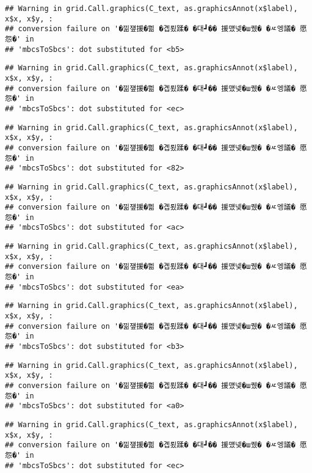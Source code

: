 \documentclass[
]{article}
\begin{document}
\begin{verbatim}
## Warning in grid.Call.graphics(C_text, as.graphicsAnnot(x$label), x$x, x$y, :
## conversion failure on '�낆쟾援�쁾 �곕룄蹂� �대┛�� 援먰넻�ш퀬� �ㅼ엥議� 愿怨�' in
## 'mbcsToSbcs': dot substituted for <b5>
\end{verbatim}

\begin{verbatim}
## Warning in grid.Call.graphics(C_text, as.graphicsAnnot(x$label), x$x, x$y, :
## conversion failure on '�낆쟾援�쁾 �곕룄蹂� �대┛�� 援먰넻�ш퀬� �ㅼ엥議� 愿怨�' in
## 'mbcsToSbcs': dot substituted for <ec>
\end{verbatim}

\begin{verbatim}
## Warning in grid.Call.graphics(C_text, as.graphicsAnnot(x$label), x$x, x$y, :
## conversion failure on '�낆쟾援�쁾 �곕룄蹂� �대┛�� 援먰넻�ш퀬� �ㅼ엥議� 愿怨�' in
## 'mbcsToSbcs': dot substituted for <82>
\end{verbatim}

\begin{verbatim}
## Warning in grid.Call.graphics(C_text, as.graphicsAnnot(x$label), x$x, x$y, :
## conversion failure on '�낆쟾援�쁾 �곕룄蹂� �대┛�� 援먰넻�ш퀬� �ㅼ엥議� 愿怨�' in
## 'mbcsToSbcs': dot substituted for <ac>
\end{verbatim}

\begin{verbatim}
## Warning in grid.Call.graphics(C_text, as.graphicsAnnot(x$label), x$x, x$y, :
## conversion failure on '�낆쟾援�쁾 �곕룄蹂� �대┛�� 援먰넻�ш퀬� �ㅼ엥議� 愿怨�' in
## 'mbcsToSbcs': dot substituted for <ea>
\end{verbatim}

\begin{verbatim}
## Warning in grid.Call.graphics(C_text, as.graphicsAnnot(x$label), x$x, x$y, :
## conversion failure on '�낆쟾援�쁾 �곕룄蹂� �대┛�� 援먰넻�ш퀬� �ㅼ엥議� 愿怨�' in
## 'mbcsToSbcs': dot substituted for <b3>
\end{verbatim}

\begin{verbatim}
## Warning in grid.Call.graphics(C_text, as.graphicsAnnot(x$label), x$x, x$y, :
## conversion failure on '�낆쟾援�쁾 �곕룄蹂� �대┛�� 援먰넻�ш퀬� �ㅼ엥議� 愿怨�' in
## 'mbcsToSbcs': dot substituted for <a0>
\end{verbatim}

\begin{verbatim}
## Warning in grid.Call.graphics(C_text, as.graphicsAnnot(x$label), x$x, x$y, :
## conversion failure on '�낆쟾援�쁾 �곕룄蹂� �대┛�� 援먰넻�ш퀬� �ㅼ엥議� 愿怨�' in
## 'mbcsToSbcs': dot substituted for <ec>
\end{verbatim}
\end{document}
